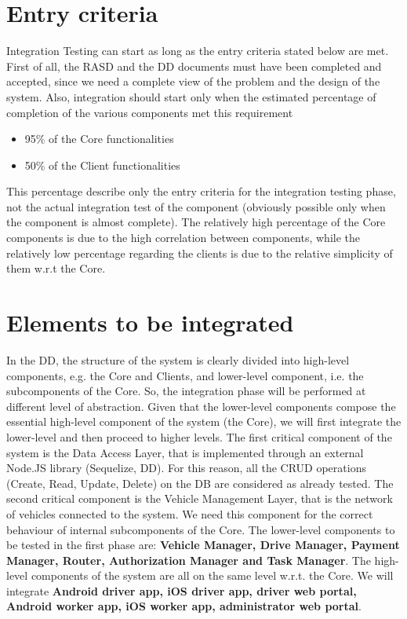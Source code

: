 \section{Entry criteria}
Integration Testing can start as long as the entry criteria stated below are met. First of all, the RASD and the DD documents must have been completed and accepted, since we need a complete view of the problem and the design of the system. \newline
Also, integration should start only when the estimated percentage of completion of the various components met this requirement
\begin{itemize}
\item 95\% of the Core functionalities
\item 50\% of the Client functionalities
\end{itemize}
This percentage describe only the entry criteria for the integration testing phase, not the actual integration test of the component (obviously possible only when the component is almost complete). The relatively high percentage of the Core components is due to the high correlation between components, while the relatively low percentage regarding the clients is due to the relative simplicity of them w.r.t the Core.

\section{Elements to be integrated}
In the DD, the structure of the system is clearly divided into high-level components, e.g. the Core and Clients, and lower-level component, i.e. the subcomponents of the Core. So, the integration phase will be performed at different level of abstraction. Given that the lower-level components compose the essential high-level component of the system (the Core), we will first integrate the lower-level and then proceed to higher levels. \newline
The first critical component of the system is the Data Access Layer, that is implemented through an external Node.JS library (Sequelize, DD). For this reason, all the CRUD operations (Create, Read, Update, Delete) on the DB are considered as already tested. 
The second critical component is the Vehicle Management Layer, that is the network of vehicles connected to the system. We need this component for the correct behaviour of internal subcomponents of the Core.
The lower-level components to be tested in the first phase are: \textbf{Vehicle Manager, Drive Manager, Payment Manager, Router, Authorization Manager and Task Manager}.
\newline
The high-level components of the system are all on the same level w.r.t. the Core. We will integrate \textbf{Android driver app, iOS driver app, driver web portal, Android worker app, iOS worker app, administrator web portal}.

